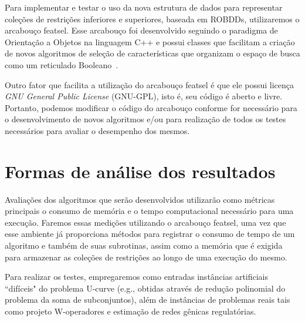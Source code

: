 \documentclass[12pt]{article}
\begin{document}
Para implementar e testar o uso da nova estrutura de dados para representar coleções de restrições inferiores e superiores, baseada em ROBDDs, utilizaremos o arcabouço featsel. Esse arcabouço foi desenvolvido seguindo o paradigma de Orientação a Objetos na linguagem C++ e possui classes que facilitam a criação de novos algoritmos de seleção de características que organizam o espaço de busca como um reticulado Booleano~\cite{msreis thesis}. 

Outro fator que facilita a utilização do arcabouço featsel é que ele possui licença \textit{GNU General Public License} (GNU-GPL), isto é, seu código é aberto e livre. Portanto, podemos modificar o código do arcabouço conforme for necessário para o desenvolvimento de novos algoritmos e/ou para realização de todos os testes necessários para avaliar o desempenho dos mesmos.


\section{Formas de análise dos resultados}

Avaliações dos algoritmos que serão desenvolvidos utilizarão como métricas principais o consumo de memória e o tempo computacional necessário para uma execução. Faremos essas medições utilizando o arcabouço featsel, uma vez que esse ambiente já proporciona métodos para registrar o consumo de tempo de um algoritmo e também de suas subrotinas, assim como a memória que é exigida para armazenar as coleções de restrições ao longo de uma execução do mesmo.

Para realizar os testes, empregaremos como entradas instâncias artificiais ``difíceis" do problema U-curve (e.g., obtidas através de redução polinomial do problema da soma de subconjuntos), além de instâncias de problemas reais tais como projeto W-operadores e estimação de redes gênicas regulatórias.
\end{document}
